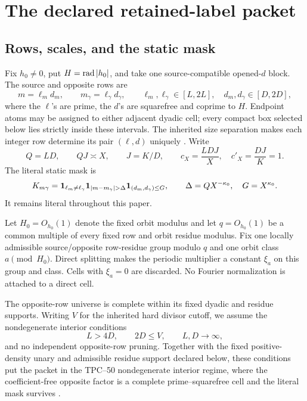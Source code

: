 \section{The declared retained-label packet}
\label{sec:tpc53-literal-packet}

\subsection{Rows, scales, and the static mask}

Fix \(h_0\ne0\), put \(H=\operatorname{rad}|h_0|\), and take one
source-compatible opened-\(d\) block.  The source and opposite rows are
\[
 m=\ell_m d_m,\qquad m_\gamma=\ell_\gamma d_\gamma,
 \qquad \ell_m,\ell_\gamma\in[L,2L],\quad
 d_m,d_\gamma\in[D,2D],
\]
where the \(\ell\)'s are prime, the \(d\)'s are squarefree and coprime
to \(H\).  Endpoint atoms may be assigned to either adjacent dyadic
cell; every compact box selected below lies strictly inside these
intervals.  The inherited size separation makes each integer row
determine its pair \((\ell,d)\) uniquely
\citep{WangTPC25,WangTPC36}.  Write
\begin{equation}
 Q=LD,\qquad QJ\asymp X,\qquad J=K/D,
 \qquad
 c_X=\frac{LDJ}{X},\quad c'_X=\frac{DJ}{K}=1.
 \label{eq:tpc53-scales}
\end{equation}
The literal static mask is
\begin{equation}
 K_{m\gamma}
 =\one_{\ell_m\ne\ell_\gamma}
  \one_{|m-m_\gamma|>\Delta}
  \one_{(d_m,d_\gamma)\le G},
 \qquad
 \Delta=QX^{-\kappa_0},\quad G=X^{\kappa_0}.
 \label{eq:tpc53-literal-mask}
\end{equation}
It remains literal throughout this paper.

Let \(H_0=O_{h_0}(1)\) denote the fixed orbit modulus and let
\(q=O_{h_0}(1)\) be a common multiple of every fixed row and orbit
residue modulus.  Fix one locally admissible source/opposite row-residue
group modulo \(q\) and one orbit class \(a\pmod {H_0}\).  Direct
splitting makes the periodic multiplier a constant \(\xi_a\) on this
group and class.  Cells with \(\xi_a=0\) are discarded.  No Fourier
normalization is attached to a direct cell.

The opposite-row universe is complete within its fixed dyadic and
residue supports.  Writing \(V\) for the inherited hard divisor cutoff,
we assume the nondegenerate interior conditions
\begin{equation}
 L>4D,\qquad 2D\le V,\qquad L,D\longrightarrow\infty,
 \label{eq:tpc53-nondegenerate-row-cell}
\end{equation}
and no independent opposite-row pruning.  Together with the fixed
positive-density unary and admissible residue support declared below,
these conditions put the packet in the TPC--50 nondegenerate interior
regime, where the coefficient-free opposite factor is a complete
prime--squarefree cell and the literal mask survives \citep{WangTPC50}.

